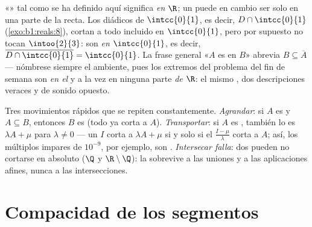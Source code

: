 \begin{example}\label{ex:b1:topology:relativedensity}
«» tal como se ha definido aquí significa  \emph{en $\R$};
un  puede en cambio ser  solo en una parte de la recta.
Los diádicos de $\intcc{0}{1}$, es decir, $D \cap \intcc{0}{1}$
(\cref{exo:b1:reals:8}), cortan a todo   incluido en
$\intcc{0}{1}$, pero por supuesto no tocan $\intoo{2}{3}$: son 
\emph{en} $\intcc{0}{1}$, es decir, $\overline{D \cap \intcc{0}{1}} =
\intcc{0}{1}$. La frase general «$A$ es  en $B$» abrevia
$B \subseteq \overline A$ --- nómbrese siempre el  ambiente,
pues los extremos del problema del fin de semana son  \emph{en
el } y a la vez  en ninguna parte \emph{de
$\R$}: el mismo , dos descripciones veraces y de sonido opuesto.
\end{example}

\begin{example}\label{ex:b1:topology:densitytricks}
Tres movimientos rápidos que se repiten constantemente.
\emph{Agrandar}: si $A$ es  y $A \subseteq B$, entonces $B$ es
 (todo  ya corta a $A$). \emph{Transportar}: si $A$
es , también lo es $\lambda A + \mu$ para $\lambda \neq 0$ ---
un  $I$ corta a $\lambda A + \mu$ si y solo si el 
$\frac{I - \mu}{\lambda}$ corta a $A$; así, los múltiplos impares de
$10^{-9}$, por ejemplo, son . \emph{Intersecar falla}: dos
  pueden no cortarse en absoluto ($\Q$ y
$\R \setminus \Q$): la  sobrevive a las uniones y a las
aplicaciones afines, nunca a las intersecciones.
\end{example}

\section{Compacidad de los segmentos}

